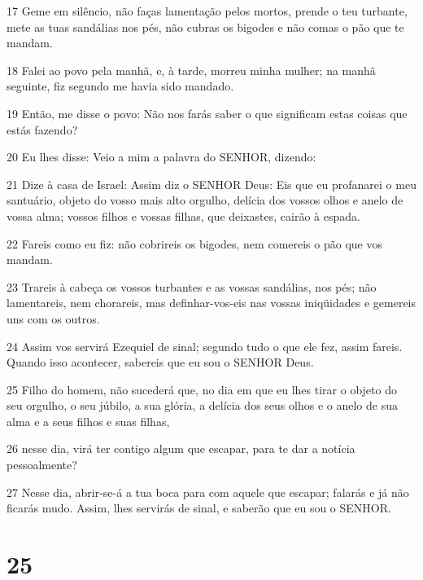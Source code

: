 \par 17 Geme em silêncio, não faças lamentação pelos mortos, prende o teu turbante, mete as tuas sandálias nos pés, não cubras os bigodes e não comas o pão que te mandam.
\par 18 Falei ao povo pela manhã, e, à tarde, morreu minha mulher; na manhã seguinte, fiz segundo me havia sido mandado.
\par 19 Então, me disse o povo: Não nos farás saber o que significam estas coisas que estás fazendo?
\par 20 Eu lhes disse: Veio a mim a palavra do SENHOR, dizendo:
\par 21 Dize à casa de Israel: Assim diz o SENHOR Deus: Eis que eu profanarei o meu santuário, objeto do vosso mais alto orgulho, delícia dos vossos olhos e anelo de vossa alma; vossos filhos e vossas filhas, que deixastes, cairão à espada.
\par 22 Fareis como eu fiz: não cobrireis os bigodes, nem comereis o pão que vos mandam.
\par 23 Trareis à cabeça os vossos turbantes e as vossas sandálias, nos pés; não lamentareis, nem chorareis, mas definhar-vos-eis nas vossas iniqüidades e gemereis uns com os outros.
\par 24 Assim vos servirá Ezequiel de sinal; segundo tudo o que ele fez, assim fareis. Quando isso acontecer, sabereis que eu sou o SENHOR Deus.
\par 25 Filho do homem, não sucederá que, no dia em que eu lhes tirar o objeto do seu orgulho, o seu júbilo, a sua glória, a delícia dos seus olhos e o anelo de sua alma e a seus filhos e suas filhas,
\par 26 nesse dia, virá ter contigo algum que escapar, para te dar a notícia pessoalmente?
\par 27 Nesse dia, abrir-se-á a tua boca para com aquele que escapar; falarás e já não ficarás mudo. Assim, lhes servirás de sinal, e saberão que eu sou o SENHOR.

\chapter{25}

